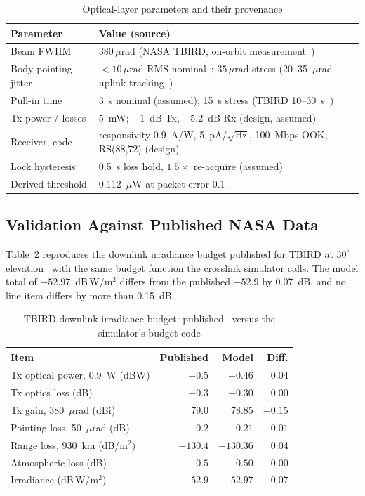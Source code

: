 \documentclass[journal]{IEEEtran}
\newcommand{\urad}{\,\mu\text{rad}}
\begin{document}
\begin{table}[!t]
\caption{Optical-layer parameters and their provenance}
\label{tab:optics}
\centering\footnotesize
\begin{tabular}{@{}p{}p{}@{}}
\toprule
Parameter & Value (source)\\
\midrule
Beam FWHM & $380\urad$ (NASA TBIRD, on-orbit measurement~\cite{schieler2023})\\
Body pointing jitter & $<10\urad$ RMS nominal~\cite{schieler2023icsos}; $35\urad$ stress (20--35~$\mu$rad uplink tracking~\cite{schieler2023})\\
Pull-in time & 3~s nominal (assumed); 15~s stress (TBIRD 10--30~s~\cite{schieler2023})\\
Tx power / losses & 5~mW; $-1$~dB Tx, $-5.2$~dB Rx (design, assumed)\\
Receiver, code & responsivity 0.9~A/W, 5~pA/$\sqrt{\text{Hz}}$, 100~Mbps OOK; RS(88,72) (design)\\
Lock hysteresis & 0.5~s loss hold, $1.5\times$ re-acquire (assumed)\\
Derived threshold & 0.112~$\mu$W at packet error 0.1\\
\bottomrule
\end{tabular}
\end{table}

\subsection{Validation Against Published NASA Data}
Table~\ref{tab:tbird} reproduces the downlink irradiance budget published for TBIRD at $30^\circ$ elevation~\cite{schieler2023} with the same budget function the crosslink simulator calls. The model total of $-52.97$~dB\,W/m$^2$ differs from the published $-52.9$ by 0.07~dB, and no line item differs by more than 0.15~dB.

\begin{table}[!t]
\caption{TBIRD downlink irradiance budget: published~\cite{schieler2023} versus the simulator's budget code}
\label{tab:tbird}
\centering\footnotesize
\begin{tabular}{@{}lrrr@{}}
\toprule
Item & Published & Model & Diff.\\
\midrule
Tx optical power, 0.9~W (dBW) & $-0.5$ & $-0.46$ & 0.04\\
Tx optics loss (dB) & $-0.3$ & $-0.30$ & 0.00\\
Tx gain, 380~$\mu$rad (dBi) & 79.0 & 78.85 & $-0.15$\\
Pointing loss, 50~$\mu$rad (dB) & $-0.2$ & $-0.21$ & $-0.01$\\
Range loss, 930~km (dB/m$^2$) & $-130.4$ & $-130.36$ & 0.04\\
Atmospheric loss (dB) & $-0.5$ & $-0.50$ & 0.00\\
\midrule
Irradiance (dB\,W/m$^2$) & $-52.9$ & $-52.97$ & $-0.07$\\
\bottomrule
\end{tabular}
\end{table}
\end{document}
